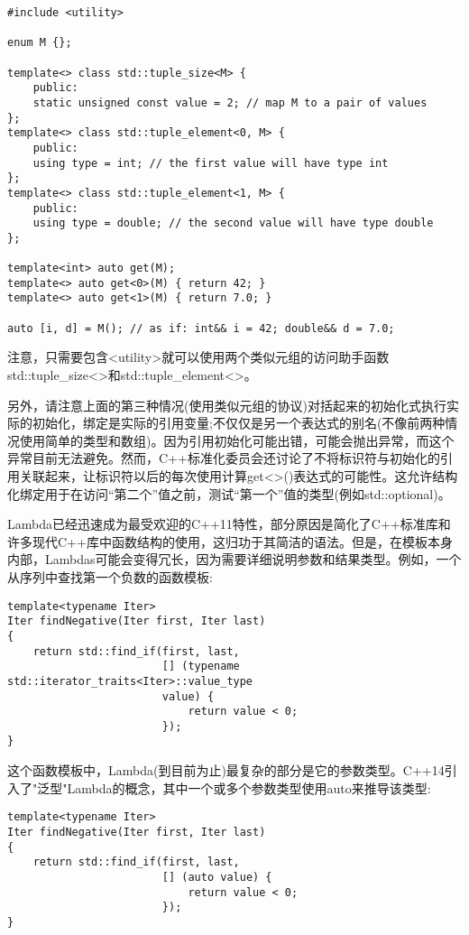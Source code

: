\begin{enumerate}
\begin{lstlisting}[style=styleCXX]
#include <utility>

enum M {};

template<> class std::tuple_size<M> {
	public:
	static unsigned const value = 2; // map M to a pair of values
};
template<> class std::tuple_element<0, M> {
	public:
	using type = int; // the first value will have type int
};
template<> class std::tuple_element<1, M> {
	public:
	using type = double; // the second value will have type double
};

template<int> auto get(M);
template<> auto get<0>(M) { return 42; }
template<> auto get<1>(M) { return 7.0; }

auto [i, d] = M(); // as if: int&& i = 42; double&& d = 7.0;
\end{lstlisting}

\end{enumerate}

注意，只需要包含<utility>就可以使用两个类似元组的访问助手函数std::tuple\_size<>和std::tuple\_element<>。

另外，请注意上面的第三种情况(使用类似元组的协议)对括起来的初始化式执行实际的初始化，绑定是实际的引用变量;不仅仅是另一个表达式的别名(不像前两种情况使用简单的类型和数组)。因为引用初始化可能出错，可能会抛出异常，而这个异常目前无法避免。然而，C++标准化委员会还讨论了不将标识符与初始化的引用关联起来，让标识符以后的每次使用计算get<>()表达式的可能性。这允许结构化绑定用于在访问“第二个”值之前，测试“第一个”值的类型(例如std::optional)。


Lambda已经迅速成为最受欢迎的C++11特性，部分原因是简化了C++标准库和许多现代C++库中函数结构的使用，这归功于其简洁的语法。但是，在模板本身内部，Lambdas可能会变得冗长，因为需要详细说明参数和结果类型。例如，一个从序列中查找第一个负数的函数模板:

\begin{lstlisting}[style=styleCXX]
template<typename Iter>
Iter findNegative(Iter first, Iter last)
{
	return std::find_if(first, last,
						[] (typename std::iterator_traits<Iter>::value_type
						value) {
							return value < 0;
						});
}
\end{lstlisting}

这个函数模板中，Lambda(到目前为止)最复杂的部分是它的参数类型。C++14引入了"泛型"Lambda的概念，其中一个或多个参数类型使用auto来推导该类型:

\begin{lstlisting}[style=styleCXX]
template<typename Iter>
Iter findNegative(Iter first, Iter last)
{
	return std::find_if(first, last,
						[] (auto value) {
							return value < 0;
						});
}
\end{lstlisting}

